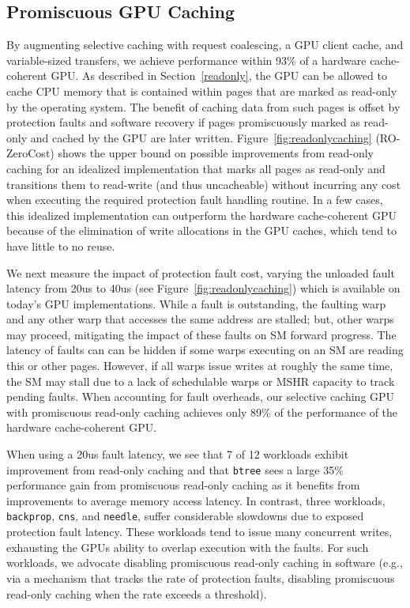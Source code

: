 \subsection{Promiscuous GPU Caching}
\label{readonlyresults}
By augmenting selective caching with request coalescing, a GPU client cache, and variable-sized transfers,
we achieve performance within 93\% of a hardware cache-coherent GPU\@. 
As described in Section~\ref{readonly}, the GPU can be allowed to cache CPU memory that is contained
within pages that are marked as read-only by the operating system. The benefit of caching data
from such pages is offset by protection
faults and software recovery if pages promiscuously marked as read-only 
and cached by the GPU are later written.
Figure~\ref{fig:readonlycaching} (RO-ZeroCost) shows the upper bound on possible improvements from read-only 
caching for an idealized implementation that marks all pages as read-only and transitions them to
read-write (and thus uncacheable)
without incurring any cost when executing the required protection fault handling routine.  In a few cases, 
this idealized implementation can outperform 
the hardware cache-coherent GPU because of the elimination of write allocations in the GPU caches,
which tend to have little to no reuse.

We next measure the impact of protection fault cost, varying the unloaded fault latency from
20us to 40us (see Figure~\ref{fig:readonlycaching}) which is available on today's GPU implementations.
While a fault is outstanding, the faulting warp and any other warp that accesses
the same address are stalled; but, other warps may proceed, mitigating the impact of these faults on SM forward progress.  
The latency of faults can can be hidden if some warps executing on an SM are reading
this or other pages.  However, if all warps issue writes at
roughly the same time, the SM may stall due to a lack of schedulable warps or MSHR
capacity to track pending faults. When accounting for fault overheads, 
our selective caching GPU with promiscuous read-only caching achieves only 89\% of the performance of the 
hardware cache-coherent GPU.

When using a 20us fault latency, we see that 7 of 12 workloads 
exhibit improvement from read-only caching
and that \texttt{btree} sees a large 35\% performance gain from promiscuous read-only caching
as it benefits from improvements to average memory
access latency.
In contrast, three workloads, \texttt{backprop}, \texttt{cns}, and
\texttt{needle}, suffer considerable slowdowns due to exposed protection fault latency.
These workloads tend to issue many concurrent writes, exhausting the GPUs
ability to overlap execution with the faults.  For such workloads, we advocate
disabling promiscuous read-only caching in software (e.g., via a mechanism that tracks
the rate of protection faults, disabling promiscuous read-only caching when the rate
exceeds a threshold).

